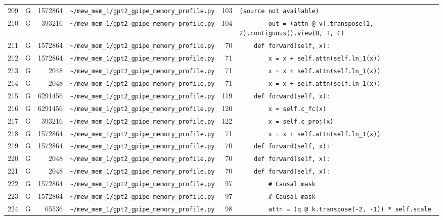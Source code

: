 \documentclass{article}
\begin{document}
\begin{longtable}{r l r p{6.5cm} r p{7.0cm}}
209 & G & 1572864 & \lstinline|~/mew_mem_1/gpt2_gpipe_memory_profile.py| & 103 & \lstinline|(source not available)| \\
210 & G & 393216 & \lstinline|~/mew_mem_1/gpt2_gpipe_memory_profile.py| & 104 & \lstinline|        out = (attn @ v).transpose(1, 2).contiguous().view(B, T, C)| \\
211 & G & 1572864 & \lstinline|~/mew_mem_1/gpt2_gpipe_memory_profile.py| & 70 & \lstinline|    def forward(self, x):| \\
212 & G & 1572864 & \lstinline|~/mew_mem_1/gpt2_gpipe_memory_profile.py| & 71 & \lstinline|        x = x + self.attn(self.ln_1(x))| \\
213 & G & 2048 & \lstinline|~/mew_mem_1/gpt2_gpipe_memory_profile.py| & 71 & \lstinline|        x = x + self.attn(self.ln_1(x))| \\
214 & G & 2048 & \lstinline|~/mew_mem_1/gpt2_gpipe_memory_profile.py| & 71 & \lstinline|        x = x + self.attn(self.ln_1(x))| \\
215 & G & 6291456 & \lstinline|~/mew_mem_1/gpt2_gpipe_memory_profile.py| & 119 & \lstinline|    def forward(self, x):| \\
216 & G & 6291456 & \lstinline|~/mew_mem_1/gpt2_gpipe_memory_profile.py| & 120 & \lstinline|        x = self.c_fc(x)| \\
217 & G & 393216 & \lstinline|~/mew_mem_1/gpt2_gpipe_memory_profile.py| & 122 & \lstinline|        x = self.c_proj(x)| \\
218 & G & 1572864 & \lstinline|~/mew_mem_1/gpt2_gpipe_memory_profile.py| & 71 & \lstinline|        x = x + self.attn(self.ln_1(x))| \\
219 & G & 1572864 & \lstinline|~/mew_mem_1/gpt2_gpipe_memory_profile.py| & 70 & \lstinline|    def forward(self, x):| \\
220 & G & 2048 & \lstinline|~/mew_mem_1/gpt2_gpipe_memory_profile.py| & 70 & \lstinline|    def forward(self, x):| \\
221 & G & 2048 & \lstinline|~/mew_mem_1/gpt2_gpipe_memory_profile.py| & 70 & \lstinline|    def forward(self, x):| \\
222 & G & 1572864 & \lstinline|~/mew_mem_1/gpt2_gpipe_memory_profile.py| & 97 & \lstinline|        # Causal mask| \\
223 & G & 1572864 & \lstinline|~/mew_mem_1/gpt2_gpipe_memory_profile.py| & 97 & \lstinline|        # Causal mask| \\
224 & G & 65536 & \lstinline|~/mew_mem_1/gpt2_gpipe_memory_profile.py| & 98 & \lstinline|        attn = (q @ k.transpose(-2, -1)) * self.scale| \\

\end{longtable}
\end{document}

